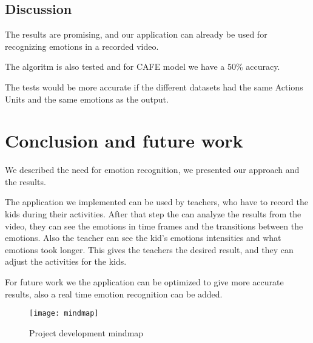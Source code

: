 \documentclass[runningheads,a4paper,11pt]{report}
\begin{document}
\newpage
\section{Discussion}
\label{section:discussion}

The results are promising, and our application can already be used for recognizing emotions in a recorded video.

The algoritm is also tested and for CAFE model we have a 50\% accuracy.

The tests would be more accurate if the different datasets had the same Actions Units and the same emotions as the output.

\chapter{Conclusion and future work}
\label{chapter:concl}

We described the need for emotion recognition, we presented our approach and the results.

The application we implemented can be used by teachers, who have to record the kids during their activities. After that step the can analyze the results from the video, they can see the emotions in time frames and the transitions between the emotions. Also the teacher can see the kid's emotions intensities and what emotions took longer. This gives the teachers the desired result, and they can adjust the activities for the kids.

For future work we the application can be optimized to give more accurate results, also a real time emotion recognition can be added.

\begin{figure}[ht]
    \centering
    \texttt{[image: mindmap]}
    \caption{Project development mindmap}
    \label{fig:mindmap}
\end{figure}




\end{document}
